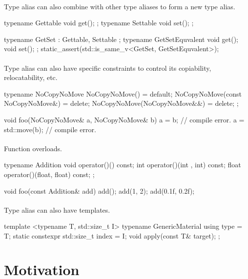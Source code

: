 \documentclass{article}
\begin{document}
\paragraph{}
Type alias can also combine with other type aliases to form a new type alias.
\begin{codeblock}
typename Gettable{ void get(); };
typename Settable{ void set(); };

typename GetSet : Gettable, Settable {};
typename GetSetEquvalent {
  void get();
  void set();
};
static_assert(std::is_same_v<GetSet, GetSetEquvalent>);
\end{codeblock}

\paragraph{}
Type alias can also have specific constraints to control its copiability, relocatability, etc.
\begin{codeblock}
typename NoCopyNoMove {
  NoCopyNoMove() = default;
  NoCopyNoMove(const NoCopyNoMove&) = delete;
  NoCopyNoMove(NoCopyNoMove&&) = delete;
};

void foo(NoCopyNoMove& a, NoCopyNoMove& b) {
  a = b; // compile error.
  a = std::move(b); // compile error.
}
\end{codeblock}

\paragraph{}
Function overloads.

\begin{codeblock}
typename Addition {
  void operator()() const;
  int operator()(int , int) const;
  float operator()(float, float) const;
};

void foo(const Addition& add) {
  add();
  add(1, 2);
  add(0.1f, 0.2f);
}
\end{codeblock}

\paragraph{}
Type alias can also have templates.
\begin{codeblock}
template <typename T, std::size_t I>
typename GenericMaterial {
  using type = T;
  static constexpr std::size_t index = I;
  void apply(const T& target);
};
\end{codeblock}

\section{Motivation}
\end{document}
